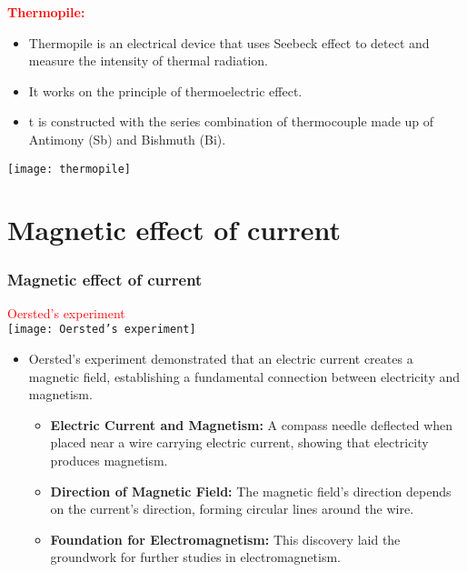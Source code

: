 \documentclass{beamer}
\begin{document}
\begin{frame}
\textcolor{red}{\textbf{Thermopile:}}
\begin{itemize}
\item Thermopile is an electrical device that uses Seebeck effect to detect and measure the intensity of thermal radiation.
\item It works on the principle of thermoelectric effect.
\item t is constructed with the series combination of thermocouple made up of Antimony (Sb) and Bishmuth (Bi).
\end{itemize}
\begin{center}
\texttt{[image: thermopile]}
\end{center}
\end{frame}


\section{Magnetic effect of current}
\begin{frame}
\frametitle{Magnetic effect of current}
\textcolor{red}{Oersted's experiment}\\
\hspace{5cm} \texttt{[image: Oersted's experiment]}
\begin{itemize}
\item Oersted's experiment demonstrated that an electric current creates a magnetic field, establishing a fundamental connection between electricity and magnetism.

    \begin{itemize}
        \item \textbf{Electric Current and Magnetism:} A compass needle deflected when placed near a wire carrying electric current, showing that electricity produces magnetism.

\item \textbf{Direction of Magnetic Field:} The magnetic field's direction depends on the current's direction, forming circular lines around the wire.

\item \textbf{Foundation for Electromagnetism:} This discovery laid the groundwork for further studies in electromagnetism.
    \end{itemize}
  \end{itemize}  
\end{frame}
\end{document}
